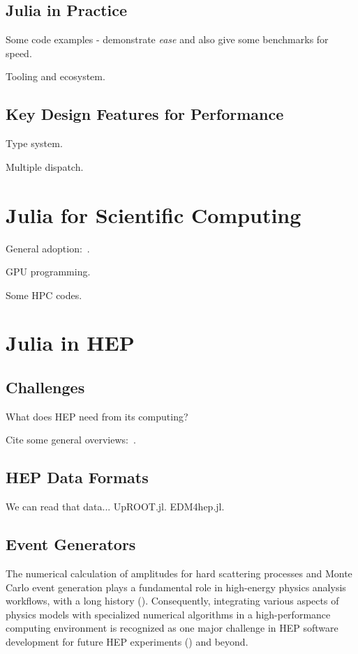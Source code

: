 \documentclass{webofc}
\begin{document}
\subsection{Julia in Practice}

Some code examples - demonstrate \emph{ease} and also give some benchmarks for
speed.

Tooling and ecosystem.

\subsection{Key Design Features for Performance}

Type system.

Multiple dispatch.

\section{Julia for Scientific Computing}

General adoption:~\cite{perkel-julia-science}.

GPU programming.

Some HPC codes.

\section{Julia in HEP}

\subsection{Challenges}

What does HEP need from its computing?

Cite some general overviews:~\cite{Stanitzki:2020bnx,eschle2023potential}.

\subsection{HEP Data Formats}

We can read that data... UpROOT.jl. EDM4hep.jl.

\subsection{Event Generators}

The numerical calculation of amplitudes for hard scattering processes and Monte Carlo event
generation plays a fundamental role in high-energy physics analysis workflows, with a
long history (\cite{campbell2024event}). Consequently, integrating various aspects of physics models with specialized
numerical algorithms in a high-performance computing environment is recognized as one major challenge
in HEP software development for future HEP experiments (\cite{HEPSoftwareFoundation:2017ggl, HSFPhysicsEventGeneratorWG:2020gxw, HSFPhysicsEventGeneratorWG:2021xti}) and beyond.
\end{document}
